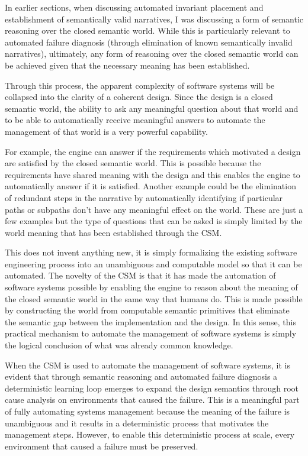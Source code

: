 \documentclass{article}
\begin{document}
In earlier sections, when discussing automated invariant placement and establishment of semantically valid narratives, I was discussing a form of semantic reasoning over the closed semantic world. While this is particularly relevant to automated failure diagnosis (through elimination of known semantically invalid narratives), ultimately, any form of reasoning over the closed semantic world can be achieved given that the necessary meaning has been established. 

Through this process, the apparent complexity of software systems will be collapsed into the clarity of a coherent design. Since the design is a closed semantic world, the ability to ask any meaningful question about that world and to be able to automatically receive meaningful answers to automate the management of that world is a very powerful capability.

For example, the engine can answer if the requirements which motivated a design are satisfied by the closed semantic world. This is possible because the requirements have shared meaning with the design and this enables the engine to automatically answer if it is satisfied. Another example could be the elimination of redundant steps in the narrative by automatically identifying if particular paths or subpaths don't have any meaningful effect on the world. These are just a few examples but the type of questions that can be asked is simply limited by the world meaning that has been established through the CSM.

This does not invent anything new, it is simply formalizing the existing software engineering process into an unambiguous and computable model so that it can be automated. The novelty of the CSM is that it has made the automation of software systems possible by enabling the engine to reason about the meaning of the closed semantic world in the same way that humans do. This is made possible by constructing the world from computable semantic primitives that eliminate the semantic gap between the implementation and the design. In this sense, this practical mechanism to automate the management of software systems is simply the logical conclusion of what was already common knowledge. 

When the CSM is used to automate the management of software systems, it is evident that through semantic reasoning and automated failure diagnosis a deterministic learning loop emerges to expand the design semantics through root cause analysis on environments that caused the failure. This is a meaningful part of fully automating systems management because the meaning of the failure is unambiguous and it results in a deterministic process that motivates the management steps. However, to enable this deterministic process at scale, every environment that caused a failure must be preserved.
\end{document}
